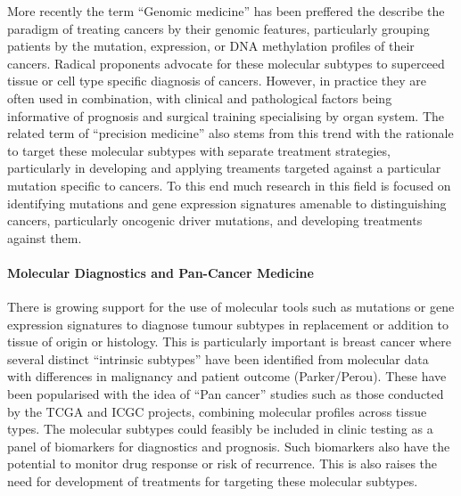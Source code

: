 More recently the term ``Genomic medicine'' has been preffered the describe the paradigm of treating cancers by their genomic features, particularly grouping patients by the mutation, expression, or DNA methylation profiles of their cancers. Radical proponents advocate for these molecular subtypes to superceed tissue or cell type specific diagnosis of cancers. However, in practice they are often used in combination, with clinical and pathological factors being informative of prognosis and surgical training specialising by organ system. The related term of ``precision medicine'' also stems from this trend with the rationale to target these molecular subtypes with separate treatment strategies, particularly in developing and applying treaments targeted against a particular mutation specific to cancers. To this end much research in this field is focused on identifying mutations and gene expression signatures amenable to distinguishing cancers, particularly oncogenic driver mutations, and developing treatments against them.

\paragraph{Molecular Diagnostics and Pan-Cancer Medicine}
There is growing support for the use of molecular tools such as mutations or gene expression signatures to diagnose tumour subtypes in replacement or addition to tissue of origin or histology. This is particularly important is breast cancer where several distinct ``intrinsic subtypes'' have been identified from molecular data with differences in malignancy and patient outcome (Parker/Perou). These have been popularised with the idea of ``Pan cancer'' studies such as those conducted by the TCGA and ICGC projects, combining molecular profiles across tissue types. The molecular subtypes could feasibly be included in clinic testing as a panel of biomarkers for diagnostics and prognosis. Such biomarkers also have the potential to monitor drug response or risk of recurrence. This is also raises the need for development of treatments for targeting these molecular subtypes.  

